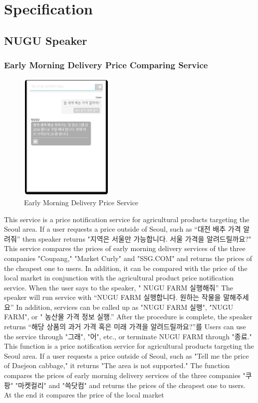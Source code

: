 \documentclass[conference]{IEEEtran}
\begin{document}
\section{Specification}
\subsection{NUGU Speaker}
\subsubsection{Early Morning Delivery Price Comparing Service\\}
\begin{figure}[b]
\centering
    \includegraphics[width =4.5cm]{1-1.eps}
    \hfil
\caption{Early Morning Delivery Price Service}
\end{figure}
This service is a price notification service for agricultural products targeting the Seoul area. If a user requests a price outside of Seoul, such as “대전 배추 가격 알려줘” then speaker returns "지역은 서울만 가능합니다. 서울 가격을 알려드릴까요?" This service compares the prices of early morning delivery services of the three companies "Coupang," "Market Curly" and "SSG.COM" and returns the prices of the cheapest one to users. In addition, it can be compared with the price of the local market in conjunction with the agricultural product price notification service. When the user says to the speaker, " NUGU FARM 실행해줘” The speaker will run service with “NUGU FARM 실행합니다. 원하는 작물을 말해주세요” In addition, services can be called up as "NUGU FARM 실행", "NUGU FARM", or " 농산물 가격 정보 실행.” After the procedure is complete, the speaker returns “해당 상품의 과거 가격 혹은 미래 가격을 알려드릴까요?”를 Users can use the service through "그래", "어", etc., or terminate NUGU FARM through "종료." This function is a price notification service for agricultural products targeting the Seoul area. If a user requests a price outside of Seoul, such as "Tell me the price of Daejeon cabbage," it returns "The area is not supported." The function compares the prices of early morning delivery services of the three companies "쿠팡" "마켓컬리" and "쓱닷컴" and returns the prices of the cheapest one to users. At the end it compares the price of the local market
\end{document}
